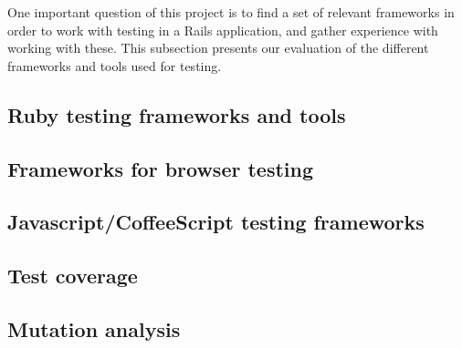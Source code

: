 \MakeShortVerb{\|}
\label{sec:choices}

One important question of this project is to find a set of relevant
frameworks in order to work with testing in a Rails application, and
gather experience with working with these. This subsection presents our
evaluation of the different frameworks and tools used for testing.\\

\subsection{Ruby testing frameworks and tools}


\subsection{Frameworks for browser testing}


\subsection{Javascript/CoffeeScript testing frameworks}


\subsection{Test coverage}


\subsection{Mutation analysis}

